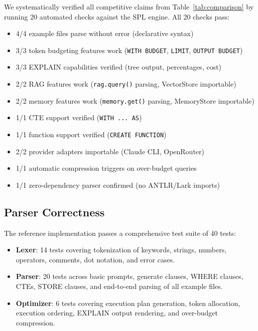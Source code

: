 \documentclass[11pt,a4paper]{article}
\begin{document}
We systematically verified all competitive claims from Table~\ref{tab:comparison} by running 20 automated checks against the SPL engine. All 20 checks pass:

\begin{itemize}[nosep]
  \item 4/4 example files parse without error (declarative syntax)
  \item 3/3 token budgeting features work (\texttt{WITH BUDGET}, \texttt{LIMIT}, \texttt{OUTPUT BUDGET})
  \item 3/3 EXPLAIN capabilities verified (tree output, percentages, cost)
  \item 2/2 RAG features work (\texttt{rag.query()} parsing, VectorStore importable)
  \item 2/2 memory features work (\texttt{memory.get()} parsing, MemoryStore importable)
  \item 1/1 CTE support verified (\texttt{WITH ... AS})
  \item 1/1 function support verified (\texttt{CREATE FUNCTION})
  \item 2/2 provider adapters importable (Claude CLI, OpenRouter)
  \item 1/1 automatic compression triggers on over-budget queries
  \item 1/1 zero-dependency parser confirmed (no ANTLR/Lark imports)
\end{itemize}

\subsection{Parser Correctness}

The reference implementation passes a comprehensive test suite of 40 tests:

\begin{itemize}[nosep]
  \item \textbf{Lexer}: 14 tests covering tokenization of keywords, strings, numbers, operators, comments, dot notation, and error cases.
  \item \textbf{Parser}: 20 tests across basic prompts, generate clauses, WHERE clauses, CTEs, STORE clauses, and end-to-end parsing of all example files.
  \item \textbf{Optimizer}: 6 tests covering execution plan generation, token allocation, execution ordering, EXPLAIN output rendering, and over-budget compression.
\end{itemize}

\end{document}
